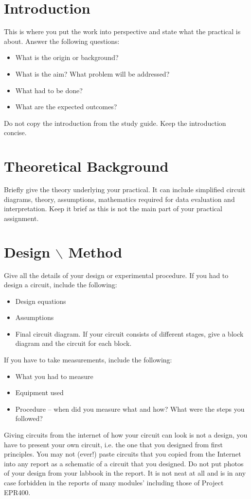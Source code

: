 \documentclass[a4paper,12pt]{report}
\begin{document}
	


\pagebreak
\tableofcontents
\pagebreak

\setcounter{page}{1}

\section{Introduction}
This is where you put the work into perspective and state what the practical is about. Answer the following questions:
\begin{itemize}
\item What is the origin or background?
\item What is the aim? What problem will be addressed?
\item What had to be done?
\item What are the expected outcomes?
\end{itemize}
Do not copy the introduction from the study guide. Keep the introduction concise.

\section{Theoretical Background}
Briefly give the theory underlying your practical. It can include simplified circuit diagrams, theory, assumptions, mathematics required for data evaluation and interpretation. Keep it brief as this is not the main part of your practical assignment.
\section{Design $\backslash$ Method}
Give all the details of your design or experimental procedure.
If you had to design a circuit, include the following:
\begin{itemize}
\item Design equations
\item Assumptions
\item Final circuit diagram. If your circuit consists of different stages, give a block diagram and the circuit for each block.
\end{itemize}

If you have to take measurements, include the following:
\begin{itemize}
\item What you had to measure
\item Equipment used
\item Procedure – when did you measure what and how? What were the steps you followed?
\end{itemize}
Giving circuits from the internet of how your circuit can look is not a design, you have to present your own circuit, i.e. the one that you designed from first principles. You may not (ever!) paste circuits that you copied from the Internet into any report as a schematic of a circuit that you designed.
Do not put photos of your design from your labbook in the report. It is not neat at all and is in any case forbidden in the reports of many modules' including those of Project EPR400.
\end{document}
